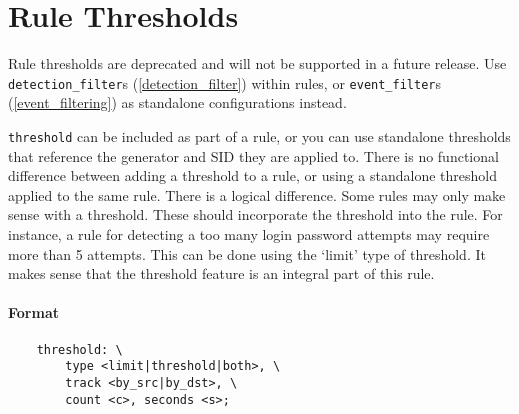 \documentclass[english]{report}
\newenvironment{note}{
\samepage
    \vspace{10pt}{\textsf{
        {\hspace{7pt}\Huge{$\triangle$\hspace{-12.5pt}{\Large{$^!$}}}}\hspace{5pt}
        {\Large{NOTE}}
    }
    }
   \begin{center}
    \par\vspace{-17pt}

    \begin{lrbox}{\savepar}
    \begin{minipage}[r]{6in}
}
{
    \end{minipage}
    \end{lrbox}
    \fbox{
        \usebox{
            \savepar
	}
    }
    \par\vskip10pt
    \end{center}
}
\newenvironment{note}{
        \begin{rawhtml}
        <p><table border="1"><tr><td><b>
        Note:&nbsp;&nbsp;</b>
        \end{rawhtml}
}{
        \begin{rawhtml}
        </b></td></tr></table></p>
        \end{rawhtml}
}
\begin{document}
\section{Rule Thresholds}

\begin{note}
Rule thresholds are deprecated and will not be supported in a future release.
Use \texttt{detection\_filter}s (\ref{detection_filter}) within rules, or
\texttt{event\_filter}s (\ref{event_filtering}) as standalone configurations
instead.
\end{note}

\texttt{threshold} can be included as part of a rule, or you can use standalone
thresholds that reference the generator and SID they are applied to. There is
no functional difference between adding a threshold to a rule, or using a
standalone threshold applied to the same rule.   There is a logical difference.
Some rules may only make sense with a threshold.  These should incorporate the
threshold into the rule.  For instance, a rule for detecting a too many login
password attempts may require more than 5 attempts.  This can be done using the
`limit' type of threshold.  It makes sense that the threshold feature is an
integral part of this rule.

\paragraph{Format}

\begin{verbatim}
    threshold: \
        type <limit|threshold|both>, \
        track <by_src|by_dst>, \
        count <c>, seconds <s>;
\end{verbatim}
\end{document}
